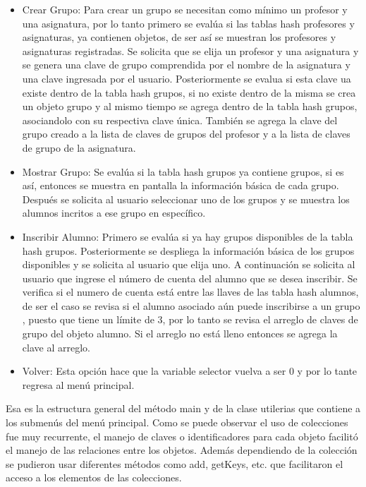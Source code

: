\documentclass[12pt, letterpaper]{report}
\begin{document}
\begin{itemize}
  \item Crear Grupo: Para crear un grupo se necesitan como mínimo un profesor y una asignatura, por lo tanto primero se evalúa si las tablas hash profesores y asignaturas, ya contienen objetos, de ser así se muestran los profesores y asignaturas registradas. Se solicita que se elija un profesor y una asignatura y se genera una clave de grupo comprendida por el nombre de la asignatura y una clave ingresada por el usuario. Posteriormente se evalua si esta clave ua existe dentro de la tabla hash grupos, si no existe dentro de la misma se crea un objeto grupo y al mismo tiempo se agrega dentro de la tabla hash grupos, asociandolo con su respectiva clave única. También se agrega la clave del grupo creado a la lista de claves de grupos del profesor y a la lista de claves de grupo de la asignatura. 
  \item Mostrar Grupo: Se evalúa si la tabla hash grupos ya contiene grupos, si es así, entonces se muestra en pantalla la información básica de cada grupo. Después se solicita al usuario seleccionar uno de los grupos y se muestra los alumnos incritos a ese grupo en específico. 
  \item Inscribir Alumno: Primero se evalúa si ya hay grupos disponibles de la tabla hash grupos. Posteriormente se despliega la información básica de los grupos disponibles y se solicita al usuario que elija uno. A continuación se solicita al usuario que ingrese el número de cuenta del alumno que se desea inscribir. Se verifica si el numero de cuenta está entre las llaves de las tabla hash alumnos, de ser el caso se revisa si el alumno asociado aún puede inscribirse a un grupo , puesto que tiene un límite de 3, por lo tanto se revisa el arreglo de claves de grupo del objeto alumno. Si el arreglo no está lleno entonces se agrega la clave al arreglo. 
  \item Volver: Esta opción hace que la variable selector vuelva a ser 0 y por lo tante regresa al menú principal.
\end{itemize}

Esa es la estructura general del método main y de la clase utilerias que contiene a los submenús del menú principal. Como se puede observar el uso de colecciones fue muy recurrente, el manejo de claves o identificadores para cada objeto facilitó el manejo de las relaciones entre los objetos. Además dependiendo de la colección se pudieron usar diferentes métodos como add, getKeys, etc. que facilitaron el acceso a los elementos de las colecciones. 
\end{document}
